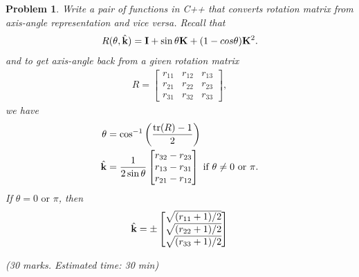 \documentclass[twocolumn]{article}
\newtheorem{prob}{Problem}
\begin{document}
\begin{prob}
  Write a pair of functions in C++ that converts rotation matrix from axis-angle
  representation and vice versa. Recall that
  \begin{align}
    R(\theta, \hat{\mathbf{k}}) = \mathbf{I} + \sin \theta \mathbf{K} + (1-cos \theta) \mathbf{K}^2.
  \end{align}
  and to get axis-angle back from a given rotation matrix
  \begin{align}
    R = \begin{bmatrix}
      r_{11} & r_{12} & r_{13} \\
      r_{21} & r_{22} & r_{23} \\
      r_{31} & r_{32} & r_{33}
      \end{bmatrix},
  \end{align}
  we have
  \begin{align}
    \theta &= \cos^{-1} \left(\frac{\text{tr}(R) - 1}{2}\right)
    \\
    \hat{\mathbf{k}} &= \frac{1}{2\sin\theta}\begin{bmatrix}
      r_{32} - r_{23} \\
      r_{13} - r_{31} \\
      r_{21} - r_{12}
      \end{bmatrix} \text{ if  } \theta \ne 0 \text{ or } \pi.
  \end{align}
 If $\theta = 0 \text{ or } \pi$, then
 \begin{align}
   \hat{\mathbf{k}} = \pm\begin{bmatrix}
    \sqrt{(r_{11} + 1)/2}\\
    \sqrt{(r_{22} + 1)/2}\\
    \sqrt{(r_{33} + 1)/2}
   \end{bmatrix}
   \end{align}
  
  (30 marks. Estimated time: 30 min)
  \label{prob:euler-to-rotmat}
\end{prob}
\end{document}
